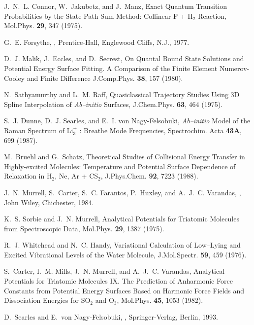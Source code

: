\begin{thebibliography}{999}
J.~N.~L. Connor, W.~Jakubetz, and J.~Manz,
Exact Quantum Transition Probabilities by the State Path Sum Method:
Collinear F + H$_2$ Reaction,
\newblock Mol.Phys. {\bf 29}, 347 (1975).

G.~E. Forsythe,
,
\newblock Prentice-Hall, Englewood Cliffs, N.J., 1977.

D.~J. Malik, J.~Eccles, and D.~Secrest,
On Quantal Bound State Solutions and Potential Energy Surface Fitting.
A Comparison of the Finite Element Numerov-Cooley and Finite Difference 
\newblock J.Comp.Phys. {\bf 38}, 157 (1980).

N.~Sathyamurthy and L.~M. Raff,
Quasiclassical Trajectory 
Studies Using 3D Spline Interpolation of {\it Ab--initio} Surfaces,
\newblock J.Chem.Phys. {\bf 63}, 464 (1975).

S.~J. Dunne, D.~J. Searles, and E.~I. {von Nagy-Felsobuki},
{\it Ab--initio} 
Model of the Raman Spectrum of Li$_3^+$ : Breathe Mode Frequencies,
\newblock Spectrochim. Acta {\bf 43A}, 699 (1987).

M.~Bruehl and G.~Schatz,
Theoretical Studies of Collisional Energy Transfer in Highly-excited 
Molecules: Temperature and Potential Surface Dependence of Relaxation
in H$_2$, Ne, Ar + CS$_2$,
\newblock J.Phys.Chem. {\bf 92}, 7223 (1988).

J.~N. Murrell, S.~Carter, 
S.~C. Farantos, P.~Huxley, and A.~J.~C. Varandas,
,
\newblock John Wiley, Chichester, 1984.

K.~S. Sorbie and J.~N. Murrell,
Analytical Potentials for Triatomic Molecules from Spectroscopic Data,
\newblock Mol.Phys. {\bf 29}, 1387 (1975).

R.~J. Whitehead and N.~C. Handy,
Variational Calculation of Low--Lying and Excited Vibrational Levels of
the Water Molecule,
\newblock J.Mol.Spectr. {\bf 59}, 459 (1976).


S.~Carter, I.~M. Mills, J.~N. Murrell, and A.~J.~C. Varandas,
Analytical Potentials for Triatomic Molecules IX. The Prediction of 
Anharmonic Force Constants from Potential Energy Surfaces Based on
Harmonic Force Fields and Dissociation Energies for SO$_2$ and O$_3$,
\newblock Mol.Phys. {\bf 45}, 1053 (1982).

D.~Searles and E.~{von Nagy-Felsobuki},
,
\newblock Springer-Verlag, Berlin, 1993.


\end{thebibliography}
